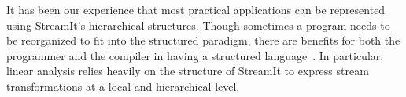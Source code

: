 It has been our experience that most practical applications can be
represented using StreamIt's hierarchical structures.  Though
sometimes a program needs to be reorganized to fit into the structured
paradigm, there are benefits for both the programmer and the compiler
in having a structured language~\cite{streamitcc}.  In particular,
linear analysis relies heavily on the structure of StreamIt to express
stream transformations at a local and hierarchical level.
